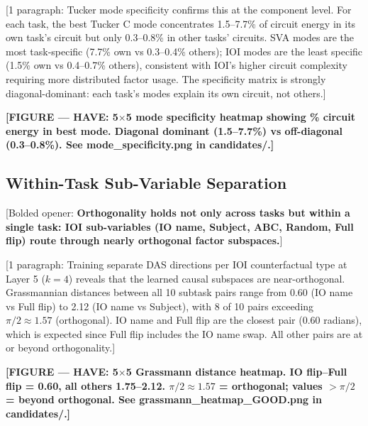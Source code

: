 \documentclass[11pt]{article}
\begin{document}
[1 paragraph: Tucker mode specificity confirms this at the component level.
For each task, the best Tucker C mode concentrates 1.5--7.7\% of circuit
energy in its own task's circuit but only 0.3--0.8\% in other tasks' circuits.
SVA modes are the most task-specific (7.7\% own vs 0.3--0.4\% others);
IOI modes are the least specific (1.5\% own vs 0.4--0.7\% others),
consistent with IOI's higher circuit complexity requiring more distributed
factor usage. The specificity matrix is strongly diagonal-dominant:
each task's modes explain its own circuit, not others.]

\textbf{[FIGURE --- HAVE: 5$\times$5 mode specificity heatmap showing
\% circuit energy in best mode. Diagonal dominant (1.5--7.7\%) vs
off-diagonal (0.3--0.8\%). See mode\_specificity.png in candidates/.]}


\subsection{Within-Task Sub-Variable Separation}
\label{sec:subtask_orthogonality}


[Bolded opener: \textbf{Orthogonality holds not only across tasks but
within a single task: IOI sub-variables (IO name, Subject, ABC, Random,
Full flip) route through nearly orthogonal factor subspaces.}]

[1 paragraph: Training separate DAS directions per IOI counterfactual
type at Layer 5 ($k=4$) reveals that the learned causal subspaces are
near-orthogonal. Grassmannian distances between all 10 subtask pairs
range from 0.60 (IO name vs Full flip) to 2.12 (IO name vs Subject),
with 8 of 10 pairs exceeding $\pi/2 \approx 1.57$ (orthogonal).
IO name and Full flip are the closest pair (0.60 radians), which is
expected since Full flip includes the IO name swap. All other pairs
are at or beyond orthogonality.]

\textbf{[FIGURE --- HAVE: 5$\times$5 Grassmann distance heatmap.
IO flip--Full flip = 0.60, all others 1.75--2.12.
$\pi/2 \approx 1.57$ = orthogonal; values $> \pi/2$ = beyond orthogonal.
See grassmann\_heatmap\_GOOD.png in candidates/.]}
\end{document}
